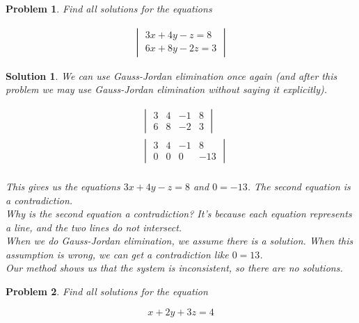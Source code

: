 \documentclass{article}
\newtheorem{problem}{Problem}
\newtheorem*{solution}{Solution}
\begin{document}
\begin{problem}
Find all solutions for the equations

\begin{align*}
\begin{vmatrix}
3x + 4y - z = 8 \\
6x + 8y - 2z = 3
\end{vmatrix}
\end{align*}

\end{problem}

\begin{solution}

We can use Gauss-Jordan elimination once again (and after this problem we may use Gauss-Jordan elimination without saying it explicitly).

\begin{align*}
&\begin{vmatrix}
3 & 4 & -1 & 8 \\ 
6 & 8 & -2 & 3 
\end{vmatrix} \\
&\begin{vmatrix}
3 & 4 & -1 & 8 \\ 
0 & 0 & 0 & -13 
\end{vmatrix} \\
\end{align*}

This gives us the equations $3x + 4y - z = 8$ and $0 = -13$. The second equation is a contradiction. \\

Why is the second equation a contradiction? It's because each equation represents a line, and the two lines do not intersect. \\

When we do Gauss-Jordan elimination, we assume there is a solution. When this assumption is wrong, we can get a contradiction like $0 = 13$. \\

Our method shows us that the system is inconsistent, so there are no solutions.

\end{solution}

\begin{problem}
Find all solutions for the equation 

\begin{equation*}
x + 2y + 3z = 4
\end{equation*}
\end{problem}
\end{document}

